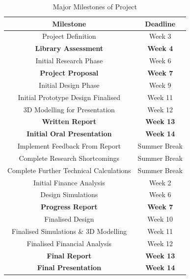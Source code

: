 \begin{table}[h!]
\centering
\begin{tabular}{||c c||} 
 \hline
 \textbf{Milestone} & \textbf{Deadline} \\ [0.5ex] 
 \hline\hline
 Project Definition & Week 3 \\ 
 \textbf{Library Assessment} & \textbf{Week 4} \\
 Initial Research Phase & Week 6 \\
 \textbf{Project Proposal} & \textbf{Week 7} \\
 Initial Design Phase & Week 9 \\
 Initial Prototype Design Finalised & Week 11 \\
 3D Modelling for Presentation & Week 12 \\ 
 \textbf{Written Report} & \textbf{Week 13} \\ 
 \textbf{Initial Oral Presentation} & \textbf{Week 14} \\
 Implement Feedback From Report & Summer Break \\
 Complete Research Shortcomings & Summer Break \\
 Complete Further Technical Calculations & Summer Break \\
 Initial Finance Analysis & Week 2 \\
 Design Simulations & Week 6 \\
 \textbf{Progress Report} & \textbf{Week 7} \\
 Finalised Design & Week 10 \\
 Finalised Simulations \& 3D Modelling & Week 11 \\
 Finalised Financial Analysis & Week 12 \\
 \textbf{Final Report} & \textbf{Week 13} \\ 
 \textbf{Final Presentation} & \textbf{Week 14} \\ [1ex] 
 \hline
\end{tabular}
\caption{Major Milestones of Project}
\label{table:1}
\end{table}    

\newpage